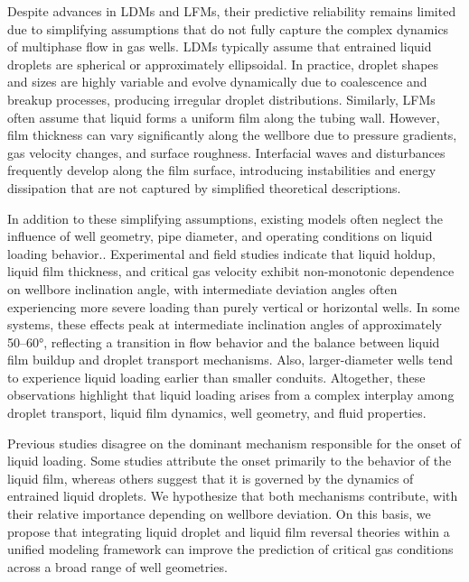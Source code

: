 \documentclass[journal=jacsat,manuscript=article]{achemso}
\theoremstyle{thmstyleone}%
\theoremstyle{thmstyletwo}%
\theoremstyle{thmstylethree}%
\begin{document}
Despite advances in LDMs and LFMs, their predictive reliability remains limited due to simplifying assumptions that do not fully capture the complex dynamics of multiphase flow in gas wells. LDMs typically assume that entrained liquid droplets are spherical or approximately ellipsoidal\cite{Turner1969, Coleman1991a, Coleman1991b, Coleman1991c, Nosseir2000, belfroid_prediction_2008, Li2001}. In practice, droplet shapes and sizes are highly variable and evolve dynamically due to coalescence and breakup processes, producing irregular droplet distributions\cite{Veeken2011}. Similarly, LFMs often assume that liquid forms a uniform film along the tubing wall\cite{KUMAR2017117}. However, film thickness can vary significantly along the wellbore due to pressure gradients, gas velocity changes, and surface roughness. Interfacial waves and disturbances frequently develop along the film surface, introducing instabilities and energy dissipation that are not captured by simplified theoretical descriptions.

In addition to these simplifying assumptions, existing models often neglect the influence of well geometry, pipe diameter, and operating conditions on liquid loading behavior.\cite{Barnea1980, LANDJOBOPAGOU2020103641}.  Experimental and field studies indicate that liquid holdup, liquid film thickness, and critical gas velocity exhibit non-monotonic dependence on wellbore inclination angle, with intermediate deviation angles often experiencing more severe loading than purely vertical or horizontal wells\cite{belfroid_prediction_2008, LANDJOBOPAGOU2020103641, Chen2016, Veeken2011, Luo2013}. In some systems, these effects peak at intermediate inclination angles of approximately 50–60°, reflecting a transition in flow behavior and the balance between liquid film buildup and droplet transport mechanisms. Also, larger-diameter wells tend to experience liquid loading earlier than smaller conduits. Altogether, these observations highlight that liquid loading arises from a complex interplay among droplet transport, liquid film dynamics, well geometry, and fluid properties\cite{WangY2010}.

Previous studies disagree on the dominant mechanism responsible for the onset of liquid loading. Some studies attribute the onset primarily to the behavior of the liquid film\cite{Veeken2011, Joseph2018, Waltrich2015}, whereas others suggest that it is governed by the dynamics of entrained liquid droplets\cite{KUMAR2017117, Liu2018, Veeken2011}. We hypothesize that both mechanisms contribute, with their relative importance depending on wellbore deviation. On this basis, we propose that integrating liquid droplet and liquid film reversal theories within a unified modeling framework can improve the prediction of critical gas conditions across a broad range of well geometries.
\end{document}
